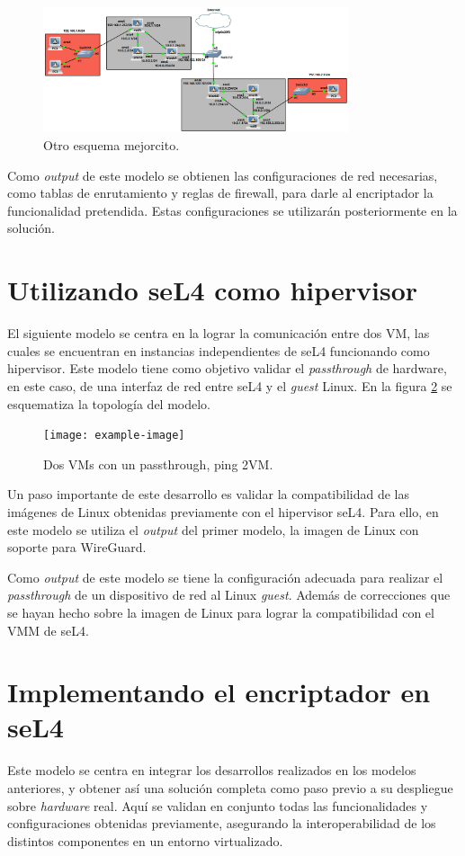 \begin{figure}[h!]
    \centering
    \includegraphics[width=0.8\textwidth]{../figs/gns3_2.png}
    \caption{Otro esquema mejorcito.}
    \label{diag:gns3_2}
\end{figure}

Como \textit{output} de este modelo se obtienen las configuraciones de red necesarias, como tablas de enrutamiento y reglas de firewall, para darle al encriptador la funcionalidad pretendida. Estas configuraciones se utilizarán posteriormente en la solución.

\section{Utilizando seL4 como hipervisor}
El siguiente modelo se centra en la lograr la comunicación entre dos VM, las cuales se encuentran en instancias independientes de seL4 funcionando como hipervisor. Este modelo tiene como objetivo validar el \textit{passthrough} de hardware, en este caso, de una interfaz de red entre seL4 y el \textit{guest} Linux. En la figura \ref{diag:esquema_passthrough} se esquematiza la topología del modelo.

\begin{figure}[h!]
    \centering
    \texttt{[image: example-image]}
    \caption{Dos VMs con un passthrough, ping 2VM.}
    \label{diag:esquema_passthrough}
\end{figure}

Un paso importante de este desarrollo es validar la compatibilidad de las imágenes de Linux obtenidas previamente con el hipervisor seL4. Para ello, en este modelo se utiliza el \textit{output} del primer modelo, la imagen de Linux con soporte para WireGuard.

Como \textit{output} de este modelo se tiene la configuración adecuada para realizar el \textit{passthrough} de un dispositivo de red al Linux \textit{guest}. Además de correcciones que se hayan hecho sobre la imagen de Linux para lograr la compatibilidad con el VMM de seL4.

\section{Implementando el encriptador en seL4}
Este modelo se centra en integrar los desarrollos realizados en los modelos anteriores, y obtener así una solución completa como paso previo a su despliegue sobre \textit{hardware} real. Aquí se validan en conjunto todas las funcionalidades y configuraciones obtenidas previamente, asegurando la interoperabilidad de los distintos componentes en un entorno virtualizado.

